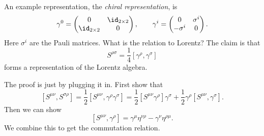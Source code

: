 \documentclass[12pt]{article}
\begin{document}
An example representation, the \emph{chiral representation}, is
\[
\gamma^0 =
\begin{pmatrix}
	0 & \id_{2 \times 2} \\
	\id_{2 \times 2} & 0
\end{pmatrix}, \qquad
\gamma^{i} =
\begin{pmatrix}
	0 & \sigma^i \\
	-\sigma^i & 0
\end{pmatrix}.
\]
Here $\sigma^i$ are the Pauli matrices. What is the relation to Lorentz? The claim is that
\[
	S^{\rho\sigma} = \frac 14 [\gamma^{\rho}, \gamma^{\sigma}]
\]
forms a representation of the Lorentz algebra.

\begin{proofbox}
	The proof is just by plugging it in. First show that
	\[
		[S^{\mu\nu}, S^{\sigma\rho}] = \frac 12 [S^{\mu\nu}, \gamma^{\rho} \gamma^{\sigma}] = \frac 12 [S^{\mu\nu} \gamma^{\rho}] \gamma^{\sigma} + \frac 12 \gamma^{\rho} [S^{\mu\nu}, \gamma^{\sigma}].
	\]
	Then we can show
	\[
		[S^{\mu\nu}, \gamma^{\rho}] = \gamma^{\mu} \eta^{\nu\rho} - \gamma^{\nu} \eta^{\rho\mu}.
	\]
	We combine this to get the commutation relation.
\end{proofbox}
\end{document}
